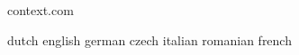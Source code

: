 



\startlogginginterface context.com



\startcommands                    dutch                            english
                                  german                           czech
                                  italian                          romanian
                                  french

